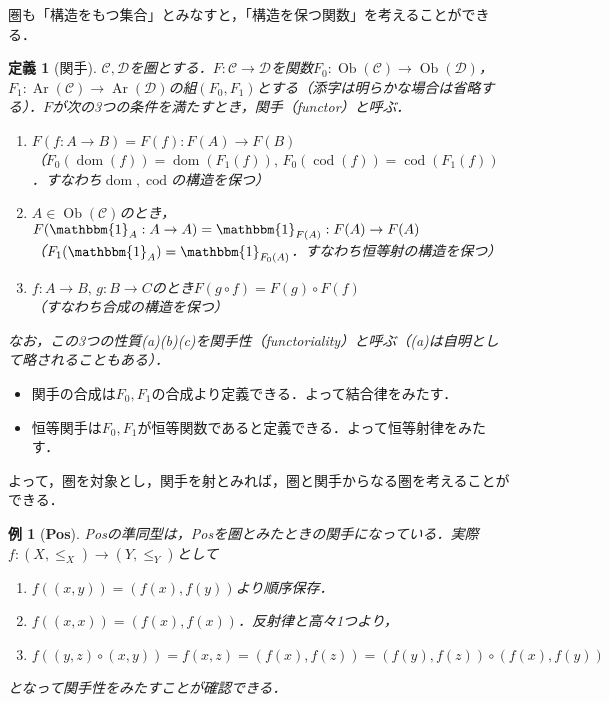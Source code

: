 \documentclass[dvipdfmx,a4j,10pt]{jsarticle}
\theoremstyle{mystyle1}
\theoremstyle{mystyle2}
\newtheorem{dfn*}{定義}
\newtheorem{example}{例}
\renewcommand{\labelenumi}{\ensuremath{\blacksquare}}
\renewcommand{\labelenumi}{(\arabic{enumi})}%
\DeclareMathOperator{\Ob}{Ob}
\DeclareMathOperator{\Ar}{Ar}
\DeclareMathOperator{\dom}{dom}
\DeclareMathOperator{\cod}{cod}
\begin{document}

圏も「構造をもつ集合」とみなすと，「構造を保つ関数」を考えることができる．

\begin{dfn*}[関手]
	$\mathcal{C},\mathcal{D}$を圏とする．$F:\mathcal{C}\to\mathcal{D}$を関数$F_0:\Ob(\mathcal{C})\to\Ob(\mathcal{D})$，$F_1:\Ar(\mathcal{C})\to\Ar(\mathcal{D})$の組$(F_0,F_1)$とする（添字は明らかな場合は省略する）．$F$が次の3つの条件を満たすとき，関手（functor）と呼ぶ．
	\begin{enumerate}\renewcommand{\labelenumi}{(\alph{enumi})}
		\item $F(f:A\to B)=F(f):F(A)\to F(B)$\\
		      （$F_0(\dom(f))=\dom(F_1(f)),\,F_0(\cod(f))=\cod(F_1(f))$．すなわち$\dom,\cod$の構造を保つ）
		\item $A\in\Ob(\mathcal{C})$のとき，$F(\mathbbm{1}_A:A\to A)=\mathbbm{1}_{F(A)}:F(A)\to F(A)$\\
		      （$F_1(\mathbbm{1}_A)=\mathbbm{1}_{F_0(A)}$．すなわち恒等射の構造を保つ）
		\item $f:A\to B,\, g:B\to C$のとき$F(g\circ f)=F(g)\circ F(f)$\\
		      （すなわち合成の構造を保つ）
	\end{enumerate}
	なお，この3つの性質(a)(b)(c)を関手性（functoriality）と呼ぶ（(a)は自明として略されることもある）．
\end{dfn*}

\begin{itemize}
	\item 関手の合成は$F_0,F_1$の合成より定義できる．よって結合律をみたす．
	\item 恒等関手は$F_0,F_1$が恒等関数であると定義できる．よって恒等射律をみたす．
\end{itemize}
よって，圏を対象とし，関手を射とみれば，圏と関手からなる圏を考えることができる．

\begin{example}[\textbf{Pos}]
	Posの準同型は，Posを圏とみたときの関手になっている．実際$f:(X,\leq_X)\to (Y,\leq_Y)$として
	\begin{enumerate}\renewcommand{\labelenumi}{(\alph{enumi})}
		\item $f((x,y))=(f(x),f(y))$より順序保存．
		\item $f((x,x))=(f(x),f(x))$．反射律と高々1つより，
		\item $f((y,z)\circ (x,y))=f(x,z)=(f(x),f(z))=(f(y),f(z))\circ (f(x),f(y))$
	\end{enumerate}
	となって関手性をみたすことが確認できる．
\end{example}
\end{document}
